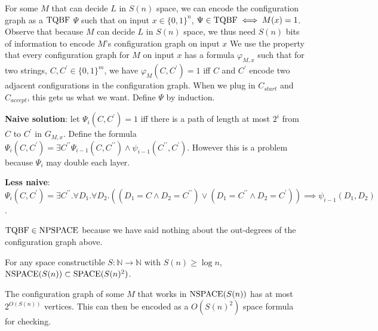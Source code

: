 \begin{note}
  For some $M$ that can decide $L$ in $S(n)$ space, we can encode the
  configuration graph as a $\mathrm{TQBF}$ $\Psi$
  such that on input $x \in \{0, 1\}^n$, $\Psi \in \mathrm{TQBF} \iff M(x) = 1$.
  Observe that because $M$ can decide $L$ in $S(n)$ space, we thus need
  $S(n)$ bits of information to encode $M$'s configuration graph on input $x$
  We use the property that every configuration graph for $M$ on input $x$ has
  a formula $\varphi_{M, x}$ such that for two strings,
  $C, C^\prime \in \{0, 1\}^m$, we have $\varphi_{M} (C, C^\prime) = 1$
  iff $C$ and $C^\prime$ encode two adjacent configurations in the
  configuration graph.
  When we plug in $C_{start}$ and $C_{accept}$, this gets us what we want.
  Define $\Psi$ by induction.

  \textbf{Naive solution}: let $\Psi_i (C, C^\prime) = 1$ iff there is a
  path of length at most $2^i$ from $C$ to $C^\prime$ in $G_{M, x}$.
  Define the formula
  $\Psi_{i} (C, C^\prime) = \exists C^{\prime \prime}
    \Psi_{i - 1} (C, C^{\prime \prime}) \land
    \psi_{i - 1} (C^{\prime \prime}, C^\prime)$.
  However this is a problem because $\Psi_i$ may double each layer.

  \textbf{Less naive}:
  $\Psi_{i} (C,C^\prime)=\exists C^{\prime\prime} . \forall D_1 . \forall D_2.
  \left( (D_1 = C \land D_2 = C^{\prime \prime}) \lor
         (D_1 = C^{\prime \prime} \land D_2 = C^\prime) \right) \implies
    \psi_{i - 1} (D_1, D_2)$.
\end{note}

\begin{note}
  $\mathrm{TQBF} \in \mathrm{NPSPACE}$ because we have said nothing about the out-degrees of
  the configuration graph above.
\end{note}

\begin{note}
  For any space constructible $S : \mathbb{N} \to \mathbb{N}$ with
  $S(n) \geq \log n$, $\mathrm{NSPACE}(S(n)) \subset \mathrm{SPACE}(S(n)^2)$.
\end{note}

\begin{note}
  The configuration graph of some $M$ that works in $\mathrm{NSPACE}(S(n))$ has at
  most $2^{O(S(n))}$ vertices.
  This can then be encoded as a $O(S(n)^2)$ space formula for checking.
\end{note}



